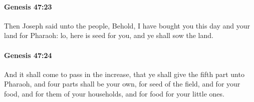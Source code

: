 		\paragraph{Genesis 47:23} %
			\label{GENESIS-47-23}

			Then Joseph said unto the people, Behold, I have bought you this day and your land for Pharaoh: lo, here is seed for you, and ye shall sow the land.


		\paragraph{Genesis 47:24} %
			\label{GENESIS-47-24}

			And it shall come to pass in the increase, that ye shall give the fifth part unto Pharaoh, and four parts shall be your own, for seed of the field, and for your food, and for them of your households, and for food for your little ones.

